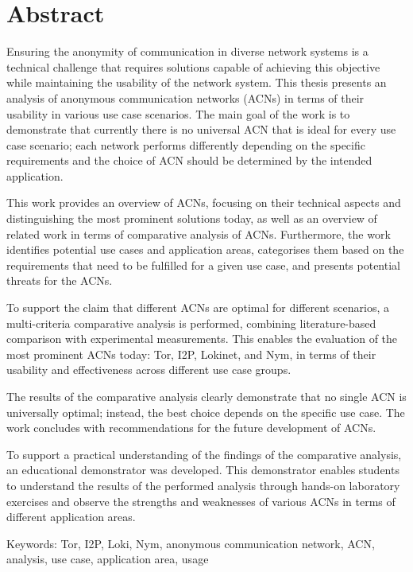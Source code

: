 \chapter*{Abstract}
\thispagestyle{plain}

Ensuring the anonymity of communication in diverse network systems is a technical challenge that requires solutions capable of achieving this objective while maintaining the usability of the network system. This thesis presents an analysis of anonymous communication networks (ACNs) in terms of their usability in various use case scenarios. The main goal of the work is to demonstrate that currently there is no universal ACN that is ideal for every use case scenario; each network performs differently depending on the specific requirements and the choice of ACN should be determined by the intended application. 

This work provides an overview of ACNs, focusing on their technical aspects and distinguishing the most prominent solutions today, as well as an overview of related work in terms of comparative analysis of ACNs. Furthermore, the work identifies potential use cases and application areas, categorises them based on the requirements that need to be fulfilled for a given use case, and presents potential threats for the ACNs.

To support the claim that different ACNs are optimal for different scenarios, a multi-criteria comparative analysis is performed, combining literature-based comparison with experimental measurements. This enables the evaluation of the most prominent ACNs today: Tor, I2P, Lokinet, and Nym, in terms of their usability and effectiveness across different use case groups.

The results of the comparative analysis clearly demonstrate that no single ACN is universally optimal; instead, the best choice depends on the specific use case. The work concludes with recommendations for the future development of ACNs.

To support a practical understanding of the findings of the comparative analysis, an educational demonstrator was developed. This demonstrator enables students to understand the results of the performed analysis through hands-on laboratory exercises and observe the strengths and weaknesses of various ACNs in terms of different application areas.

Keywords: Tor, I2P, Loki, Nym, anonymous communication network, ACN, analysis, use case, application area, usage
